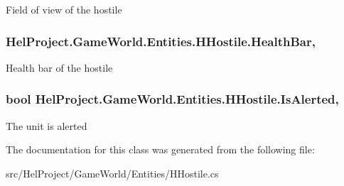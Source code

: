 Field of view of the hostile 

\hypertarget{class_hel_project_1_1_game_world_1_1_entities_1_1_h_hostile_af213001320773aa02dccb5132b4314f8}{}
\subsubsection[{Health\+Bar}]{ Hel\+Project.\+Game\+World.\+Entities.\+H\+Hostile.\+Health\+Bar\hspace{0.3cm}{\ttfamily [get]}, {\ttfamily [set]}}\label{class_hel_project_1_1_game_world_1_1_entities_1_1_h_hostile_af213001320773aa02dccb5132b4314f8}


Health bar of the hostile 

\hypertarget{class_hel_project_1_1_game_world_1_1_entities_1_1_h_hostile_a6342a67533fe79ee3fac54c5006248a9}{}
\subsubsection[{Is\+Alerted}]{\setlength{\rightskip}{0pt plus 5cm}bool Hel\+Project.\+Game\+World.\+Entities.\+H\+Hostile.\+Is\+Alerted\hspace{0.3cm}{\ttfamily [get]}, {\ttfamily [set]}}\label{class_hel_project_1_1_game_world_1_1_entities_1_1_h_hostile_a6342a67533fe79ee3fac54c5006248a9}


The unit is alerted 



The documentation for this class was generated from the following file\+:\begin{DoxyCompactItemize}
\item 
src/\+Hel\+Project/\+Game\+World/\+Entities/H\+Hostile.\+cs\end{DoxyCompactItemize}
